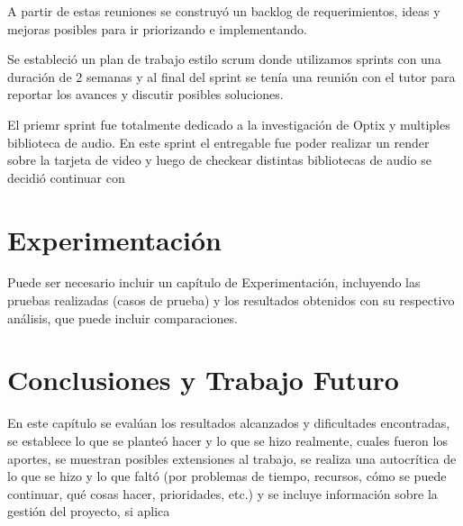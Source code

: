 \documentclass{prgrado}
\begin{document}
A partir de estas reuniones se construyó un backlog de requerimientos, ideas y mejoras posibles para ir priorizando e implementando. 

Se estableció un plan de trabajo estilo scrum donde utilizamos sprints con una duración de 2 semanas y al final del sprint se tenía una reunión con el tutor para reportar los avances y discutir posibles soluciones. 

El priemr sprint fue totalmente dedicado a la investigación de Optix y multiples biblioteca de audio. En este sprint el entregable fue poder realizar un render sobre la tarjeta de video y luego de checkear distintas bibliotecas de audio se decidió continuar con 





\chapter{Experimentación}
Puede ser necesario incluir un capítulo de Experimentación, incluyendo las pruebas realizadas (casos de prueba) y los resultados obtenidos con su respectivo análisis, que puede incluir comparaciones. 


\chapter{Conclusiones y Trabajo Futuro}

En este capítulo se evalúan los resultados alcanzados y
dificultades encontradas, se establece lo que se planteó hacer y lo que se hizo
realmente, cuales fueron los aportes, se muestran posibles extensiones al trabajo, se
realiza una autocrítica de lo que se hizo y lo que faltó (por problemas de tiempo,
recursos, cómo se puede continuar, qué cosas hacer, prioridades, etc.) y se incluye
información sobre la gestión del proyecto, si aplica

\end{document}
